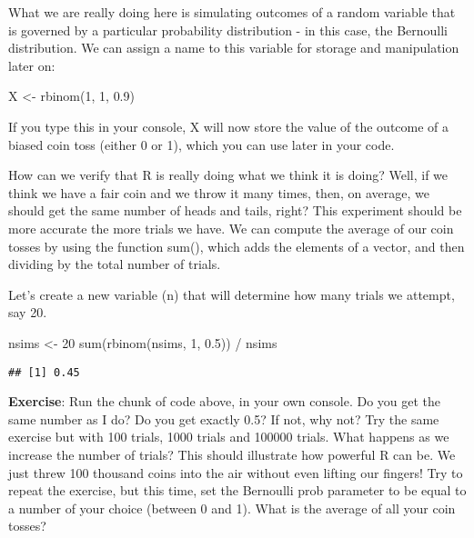 \documentclass[
]{book}
\newenvironment{Shaded}{\begin{snugshade}}{\end{snugshade}}
\newcommand{\DecValTok}[1]{\textcolor[rgb]{0.00,0.00,0.81}{#1}}
\newcommand{\FloatTok}[1]{\textcolor[rgb]{0.00,0.00,0.81}{#1}}
\newcommand{\FunctionTok}[1]{\textcolor[rgb]{0.00,0.00,0.00}{#1}}
\newcommand{\NormalTok}[1]{#1}
\newcommand{\OtherTok}[1]{\textcolor[rgb]{0.56,0.35,0.01}{#1}}
\newcommand{\SpecialCharTok}[1]{\textcolor[rgb]{0.00,0.00,0.00}{#1}}
\begin{document}
What we are really doing here is simulating outcomes of a random variable that is governed by a particular probability distribution - in this case, the Bernoulli distribution. We can assign a name to this variable for storage and manipulation later on:

\begin{Shaded}
\begin{Highlighting}[]
\NormalTok{X }\OtherTok{\textless{}{-}} \FunctionTok{rbinom}\NormalTok{(}\DecValTok{1}\NormalTok{, }\DecValTok{1}\NormalTok{, }\FloatTok{0.9}\NormalTok{)}
\end{Highlighting}
\end{Shaded}

If you type this in your console, X will now store the value of the outcome of a biased coin toss (either 0 or 1), which you can use later in your code.

How can we verify that R is really doing what we think it is doing? Well, if we think we have a fair coin and we throw it many times, then, on average, we should get the same number of heads and tails, right? This experiment should be more accurate the more trials we have. We can compute the average of our coin tosses by using the function sum(), which adds the elements of a vector, and then dividing by the total number of trials.

Let's create a new variable (n) that will determine how many trials we attempt, say 20.

\begin{Shaded}
\begin{Highlighting}[]
\NormalTok{nsims }\OtherTok{\textless{}{-}} \DecValTok{20}
\FunctionTok{sum}\NormalTok{(}\FunctionTok{rbinom}\NormalTok{(nsims, }\DecValTok{1}\NormalTok{, }\FloatTok{0.5}\NormalTok{)) }\SpecialCharTok{/}\NormalTok{ nsims}
\end{Highlighting}
\end{Shaded}

\begin{verbatim}
## [1] 0.45
\end{verbatim}

\textbf{Exercise}: Run the chunk of code above, in your own console. Do you get the same number as I do? Do you get exactly 0.5? If not, why not? Try the same exercise but with 100 trials, 1000 trials and 100000 trials. What happens as we increase the number of trials? This should illustrate how powerful R can be. We just threw 100 thousand coins into the air without even lifting our fingers! Try to repeat the exercise, but this time, set the Bernoulli prob parameter to be equal to a number of your choice (between 0 and 1). What is the average of all your coin tosses?
\end{document}
